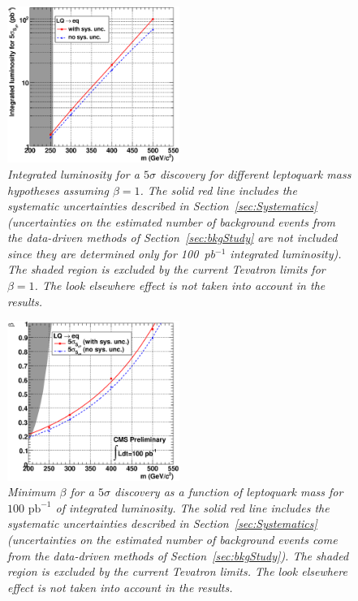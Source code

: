 \begin{figure}[h!]
 \centering
  \includegraphics[width=0.5\textwidth]{plots/cmsPotential/L5sigma_vs_m_log.eps}
 \caption{\small \sl Integrated luminosity for a $5\sigma$ discovery for different leptoquark mass hypotheses assuming $\beta=1$. 
The solid red line includes the systematic uncertainties described in Section~\ref{sec:Systematics} 
(uncertainties on the estimated number of background events from the data-driven methods
of Section~\ref{sec:bkgStudy} are not included since they are determined only for 100~pb$^{-1}$ integrated luminosity). 
The shaded region is excluded by the current Tevatron limits for $\beta=1$.
The {\it look elsewhere} effect is not taken into account in the results.\label{fig:discovery}}
\end{figure}

\begin{figure}[h!]
 \centering
  \includegraphics[width=0.5\textwidth]{plots/cmsPotential/beta_vs_m.eps}
 \caption{\small \sl Minimum $\beta$ for
a $5\sigma$ discovery as a function of leptoquark mass for $100\text{ pb}^{-1}$ of integrated luminosity. The solid red line includes the systematic
uncertainties described in Section~\ref{sec:Systematics} 
(uncertainties on the estimated number of background events come from the data-driven methods of Section~\ref{sec:bkgStudy}). 
The shaded region is excluded by the current Tevatron limits. The {\it look elsewhere} effect is not taken into account in the results.
\label{fig:discovery_beta}}
\end{figure}


